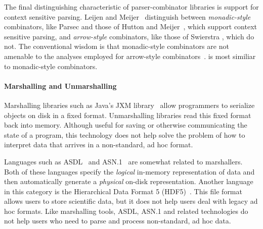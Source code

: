 The final distinguishing characteristic of parser-combinator libraries is support for context sensitive parsing. Leijen and Meijer~\cite{leijen+:parsec} distinguish between \textit{monadic-style} combinators, like Parsec and those of Hutton and Meijer~\cite{hutton+:monadic-parsing}, which support context sensitive parsing, and \textit{arrow-style} combinators, like those of Swierstra \etal{}, which do not. The conventional wisdom is that monadic-style combinators are not amenable to the analyses employed for arrow-style combinators~\cite{leijen+:parsec,swierstra+:deterministic-error-correcting}. \ddc{} is most similiar to monadic-style combinators.


\paragraph*{Marshalling and Unmarshalling}

Marshalling libraries such as Java's JXM library~\cite{jxm} 
allow programmers to
 serialize objects on disk in a fixed format.
Unmarshalling libraries read this fixed format back 
into memory.  Although useful for saving or otherwise communicating 
the state of a program, 
this technology does not help solve the problem of how to interpret
data that arrives in a non-standard, ad hoc format.

Languages such as
\textsc{ASDL}~\cite{asdl} and \textsc{ASN.1}~\cite{asn}
are somewhat related to marshallers.  Both of
these languages specify the {\em logical\/} in-memory representation of
data and then automatically generate a {\em physical\/} on-disk
representation.  Another language in this category is the Hierarchical Data
Format 5 (HDF5)~\cite{hdf5}.  This file format allows users to store
scientific data, but it does not help users deal with legacy ad hoc
formats.  Like marshalling tools, ASDL, ASN.1 and related technologies
do not help users who need to parse and process non-standard, ad hoc data.


